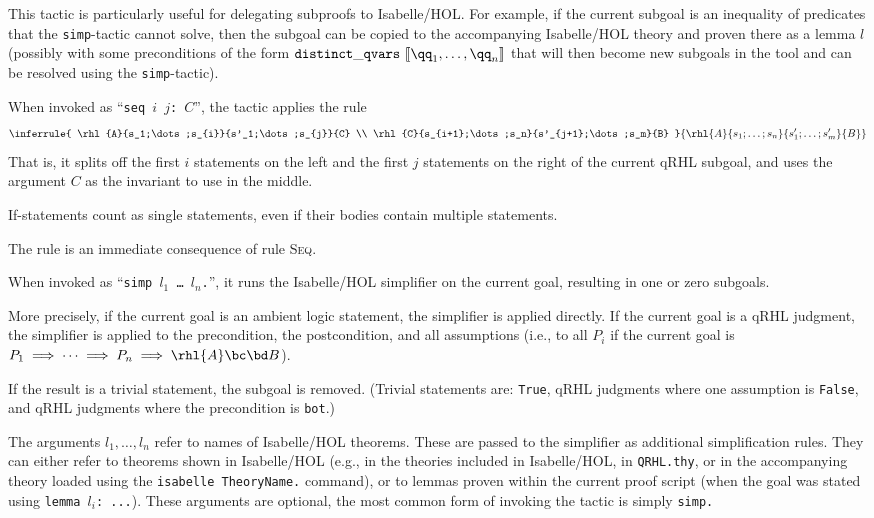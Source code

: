 \documentclass{article}
\renewcommand\ruleref[1]{rule \hbox{\textsc{#1}}}
\begin{document}
This tactic is particularly useful for delegating subproofs to
Isabelle/HOL. For example, if the current subgoal is an inequality of
predicates that the \texttt{simp}-tactic cannot solve, then the
subgoal can be copied to the accompanying Isabelle/HOL theory and
proven there as a lemma $l$
(possibly with some preconditions of the form
$\mathtt{distinct\_qvars}\ \llbracket \qq_1,\dots,\qq_n\rrbracket$
that will then become new subgoals in the tool and can be resolved
using the \texttt{simp}-tactic).


When invoked as ``\texttt{\frenchspacing seq $i$ $j$: $C$}'', the tactic applies the rule
\[
  \inferrule
  {
    \rhl{A}{s_1;\dots;s_{i}}{s'_1;\dots;s_{j}}{C}
    \\
    \rhl{C}{s_{i+1};\dots;s_n}{s'_{j+1};\dots;s_m}{B}
  }
  {\rhl{A}{s_1;\dots;s_n}{s'_1;\dots;s'_m}{B}}
\]
That is, it splits off the first $i$
statements on the left and the first $j$
statements on the right of the current qRHL subgoal, and uses the
argument $C$ as the invariant to use in the middle.

If-statements count as single statements, even if their bodies contain
multiple statements.

The rule is an immediate consequence of \ruleref{Seq}.


When invoked as ``\texttt{simp $l_1$
  \dots{} $l_n$.}'',
it runs the Isabelle/HOL simplifier on the current goal, resulting in
one or zero subgoals.

More precisely, if the current goal is an ambient logic statement, the
simplifier is applied directly. If the current goal is a qRHL
judgment, the simplifier is applied to the precondition, the
postcondition, and all assumptions (i.e., to all $P_i$
if the current goal is $P_1\implies\dots\implies P_n\implies \rhl{A}\bc\bd B$).

If the result is a trivial statement, the subgoal is removed. (Trivial
statements are: \texttt{True}, qRHL judgments where one assumption is
\texttt{False}, and qRHL judgments where the precondition is
\texttt{bot}.)

The arguments $l_1,\dots,l_n$
refer to names of Isabelle/HOL theorems. These are passed to the
simplifier as additional simplification rules. They can either refer
to theorems shown in Isabelle/HOL (e.g., in the theories included in
Isabelle/HOL, in \texttt{QRHL.thy}, or in the accompanying theory
loaded using the \texttt{isabelle TheoryName.} command), or to lemmas
proven within the current proof script (when the goal was stated using
\texttt{\frenchspacing lemma $l_i$:
  ...}).  These arguments are optional, the most common form of
invoking the tactic is simply \texttt{simp.}
\end{document}
